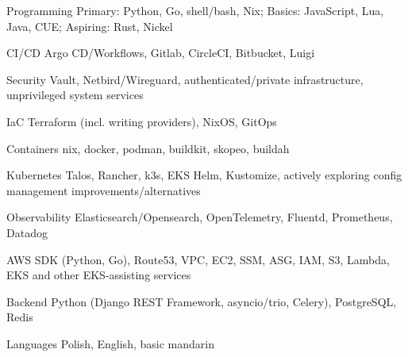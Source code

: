 

\begin{cvskills}

  \cvskill
  {Programming} %
  {Primary: Python, Go, shell/bash, Nix; Basics: JavaScript, Lua, Java, CUE; Aspiring: Rust, Nickel} %

  \cvskill
  {CI/CD} %
  {Argo CD/Workflows, Gitlab, CircleCI, Bitbucket, Luigi} %

  \cvskill
  {Security} %
  {Vault, Netbird/Wireguard, authenticated/private infrastructure, unprivileged system services} %

  \cvskill
  {IaC} %
  {Terraform (incl. writing providers), NixOS, GitOps} %

  \cvskill
  {Containers} %
  {nix, docker, podman, buildkit, skopeo, buildah} %

  \cvskill
  {Kubernetes} %
  {
   Talos, Rancher, k3s, EKS
   \newline
   Helm, Kustomize, actively exploring config management improvements/alternatives
   } %

  \cvskill
  {Observability} %
  {Elasticsearch/Opensearch, OpenTelemetry, Fluentd, Prometheus, Datadog} %

  \cvskill
  {AWS} %
  {SDK (Python, Go), Route53, VPC, EC2, SSM, ASG, IAM, S3, Lambda, EKS  and other EKS-assisting services} %

  \cvskill
  {Backend} %
  {Python (Django REST Framework, asyncio/trio, Celery), PostgreSQL, Redis} %

  \cvskill
  {Languages} %
  {Polish, English, basic mandarin} %

\end{cvskills}
